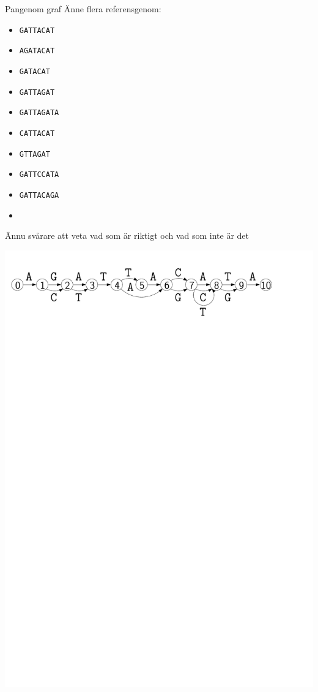 \documentclass[11pt, aspectratio=169, table]{beamer}
\begin{document}
\begin{frame}{Pangenom graf}
Änne flera referensgenom:
\vspace{-0.3cm}\begin{multicols}{2}
\begin{itemize}
\item {\tt GATTACAT}
\item {\tt AGATACAT}
\item {\tt GATACAT}
\item {\tt GATTAGAT}
\item {\tt GATTAGATA}
\item {\tt CATTACAT}
\item {\tt GTTAGAT}
\item {\tt GATTCCATA}
\item {\tt GATTACAGA}
\item[]
\end{itemize}
\end{multicols}

\vspace{-0.3cm}Ännu svårare att veta vad som är riktigt och vad som inte är det
\begin{center}
\includegraphics[width=.9\textwidth]{graph_fuzzy.pdf}
\end{center}
\end{frame}
\end{document}
